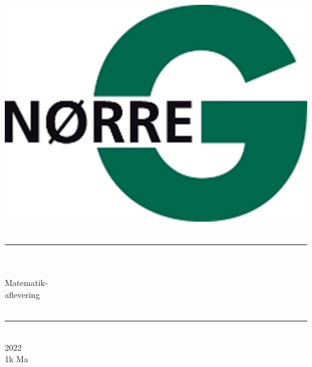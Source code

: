 \documentclass[12pt,x11names,a4paper]{article}
\begin{document}
%

\begin{titlepage}

\begin{minipage}{0.27\textwidth}

\end{minipage}
\begin{minipage}{0.73\textwidth}
\begin{center}
\phantom{h} \vspace{1cm}\\
\hspace{4cm}
\includegraphics[scale = 1]{Billeder/Norreg.png} \\
\phantom{h} \vspace{5cm}\\
\rule{0.7\textwidth}{0.3mm}\\
\phantom{h}\\
{\fontsize{50}{60}\selectfont Matematik-\\aflevering}\\
\phantom{h}\\
\rule{0.7\textwidth}{0.3mm}\\
\Large 2022\\
\Large 1k Ma

\end{center}
\end{minipage}
\end{titlepage}
\end{document}
